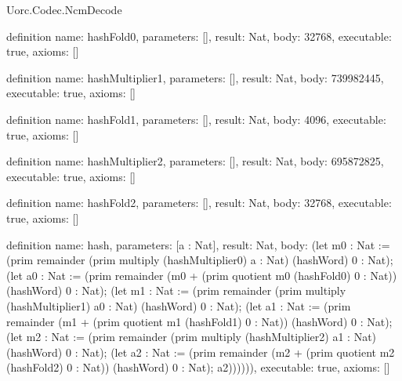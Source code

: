 \begin{lexlean}{Uorc.Codec.NcmDecode}
\begin{semanticmodule}
definition{
  name: hashFold0,
  parameters: [],
  result: Nat,
  body: 32768,
  executable: true,
  axioms: []
}

definition{
  name: hashMultiplier1,
  parameters: [],
  result: Nat,
  body: 739982445,
  executable: true,
  axioms: []
}

definition{
  name: hashFold1,
  parameters: [],
  result: Nat,
  body: 4096,
  executable: true,
  axioms: []
}

definition{
  name: hashMultiplier2,
  parameters: [],
  result: Nat,
  body: 695872825,
  executable: true,
  axioms: []
}

definition{
  name: hashFold2,
  parameters: [],
  result: Nat,
  body: 32768,
  executable: true,
  axioms: []
}

definition{
  name: hash,
  parameters: [a : Nat],
  result: Nat,
  body: (let m0 : Nat := (prim remainder (prim multiply (hashMultiplier0) a : Nat) (hashWord) 0 : Nat); (let a0 : Nat := (prim remainder (m0 + (prim quotient m0 (hashFold0) 0 : Nat)) (hashWord) 0 : Nat); (let m1 : Nat := (prim remainder (prim multiply (hashMultiplier1) a0 : Nat) (hashWord) 0 : Nat); (let a1 : Nat := (prim remainder (m1 + (prim quotient m1 (hashFold1) 0 : Nat)) (hashWord) 0 : Nat); (let m2 : Nat := (prim remainder (prim multiply (hashMultiplier2) a1 : Nat) (hashWord) 0 : Nat); (let a2 : Nat := (prim remainder (m2 + (prim quotient m2 (hashFold2) 0 : Nat)) (hashWord) 0 : Nat); a2)))))),
  executable: true,
  axioms: []
}


\end{semanticmodule}
\end{lexlean}
